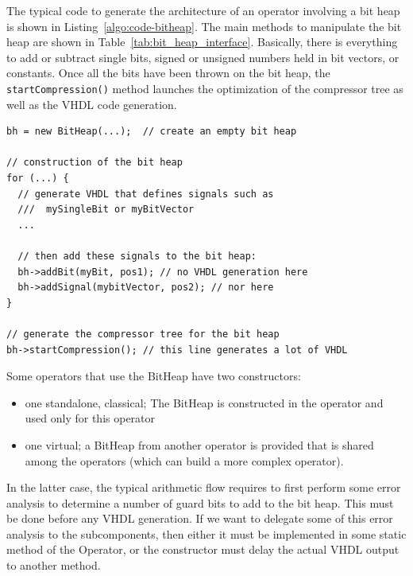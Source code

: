 \documentclass{article}
\begin{document}
The typical code to generate the architecture of an operator involving a bit heap is shown in Listing~\ref{algo:code-bitheap}.
The main methods to manipulate the bit heap are shown in Table~\ref{tab:bit_heap_interface}.
Basically, there is everything to add or subtract single bits, signed or unsigned numbers held in bit vectors, or constants. 
Once all the bits have been thrown on the bit heap, the \texttt{startCompression()} method launches the optimization of the compressor tree as well as the VHDL code generation.



\begin{lstlisting}[float, caption=Typical code for an operator involving a bit heap, label=algo:code-bitheap]
bh = new BitHeap(...);  // create an empty bit heap

// construction of the bit heap
for (...) {
  // generate VHDL that defines signals such as
  ///  mySingleBit or myBitVector
  ...
  
  // then add these signals to the bit heap: 
  bh->addBit(myBit, pos1); // no VHDL generation here 
  bh->addSignal(mybitVector, pos2); // nor here
}

// generate the compressor tree for the bit heap
bh->startCompression(); // this line generates a lot of VHDL
\end{lstlisting}


Some operators that use the BitHeap have two constructors:
\begin{itemize}
	\item one standalone, classical; The BitHeap is constructed in the operator and used only for this operator
	\item one virtual; a BitHeap from another operator is provided that is shared among the operators (which can build a more complex operator).
\end{itemize}

In the latter case, the typical arithmetic flow requires to first perform some error analysis to determine a number of guard bits to add to the bit heap.
This must be done before any VHDL generation.
If we want to delegate some of this error analysis to the subcomponents, then either it must be implemented in some static method of the Operator, or the constructor must delay the actual VHDL output to another method.
\end{document}
